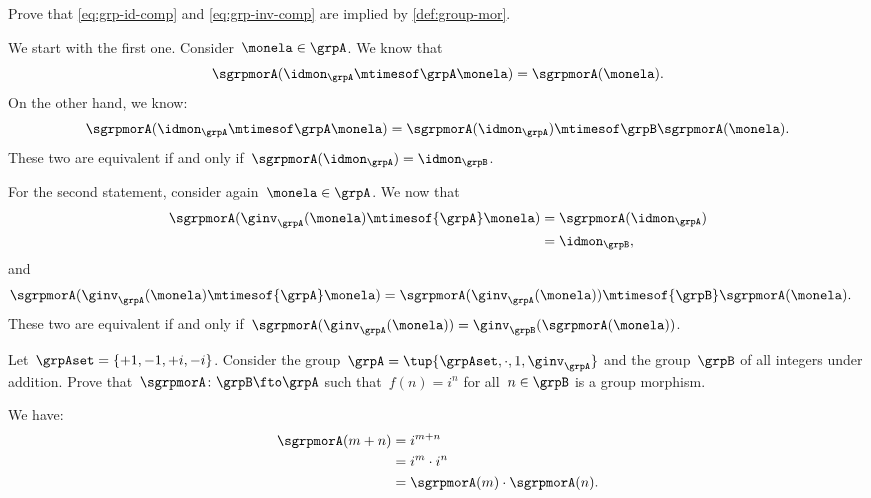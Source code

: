 \begin{exercise}
	Prove that \cref{eq:grp-id-comp} and \cref{eq:grp-inv-comp} are implied by \cref{def:group-mor}.
\end{exercise}
\begin{solution}
	We start with the first one.
	Consider~$\monela \in \grpA$.
	We know that
	\begin{equation*}
		\sgrpmorA(\idmon_\grpA \mtimesof\grpA \monela)=\sgrpmorA(\monela).
	\end{equation*}
	On the other hand, we know:
	\begin{equation*}
		\sgrpmorA(\idmon_\grpA \mtimesof\grpA \monela) = \sgrpmorA(\idmon_\grpA)\mtimesof\grpB \sgrpmorA(\monela).
	\end{equation*}
	These two are equivalent if and only if~$\sgrpmorA(\idmon_\grpA)=\idmon_\grpB$.

	For the second statement, consider again~$\monela \in \grpA$.
	We now that
	\begin{equation*}
		\begin{aligned}
			\sgrpmorA(\ginv_{\grpA}(\monela)\mtimesof{\grpA} \monela) & =\sgrpmorA(\idmon_\grpA) \\
			                                                          & =\idmon_\grpB,
		\end{aligned}
	\end{equation*}
	and
	\begin{equation*}
		\begin{aligned}
			\sgrpmorA(\ginv_{\grpA}(\monela)\mtimesof{\grpA} \monela) & =\sgrpmorA(\ginv_{\grpA}(\monela))\mtimesof{\grpB} \sgrpmorA(\monela).
		\end{aligned}
	\end{equation*}
	These two are equivalent if and only if~$\sgrpmorA(\ginv_{\grpA}(\monela))=\ginv_{\grpB}(\sgrpmorA(\monela))$.

\end{solution}

\begin{exercise}
	Let~$\grpAset=\{+1,-1,+i,-i\}$.
	Consider the group~$\grpA=\tup{\grpAset, \cdot, 1, \ginv_\grpA}$ and the group~$\grpB$ of all integers under addition.
	Prove that~$\sgrpmorA\colon \grpB \fto \grpA$ such that~$f(n)=i^n$ for all~$n\in \grpB$ is a group morphism.
\end{exercise}
\begin{solution}
	We have:
	\begin{equation*}
		\begin{aligned}
			\sgrpmorA(m+n) & =i^{m+n}                         \\
			               & =i^m \cdot i^n                   \\
			               & =\sgrpmorA(m)\cdot \sgrpmorA(n).
		\end{aligned}
	\end{equation*}
\end{solution}

